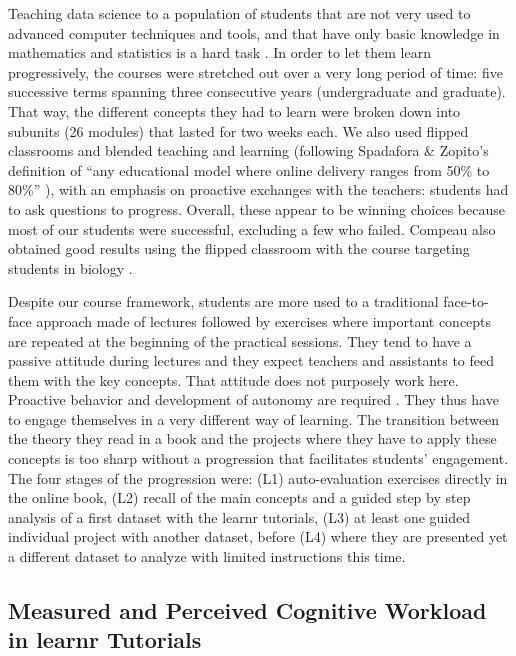 \documentclass{aims}
\theoremstyle{definition}
\begin{document}
Teaching data science to a population of students that are not very used
to advanced computer techniques and tools, and that have only basic
knowledge in mathematics and statistics is a hard task \cite{Sousa2018}.
In order to let them learn progressively, the courses were stretched out
over a very long period of time: five successive terms spanning three
consecutive years (undergraduate and graduate). That way, the different
concepts they had to learn were broken down into subunits (26 modules)
that lasted for two weeks each. We also used flipped classrooms and
blended teaching and learning (following Spadafora \& Zopito's
definition of ``any educational model where online delivery ranges from
50\% to 80\%'' \cite{Spadafora2018}), with an emphasis on proactive
exchanges with the teachers: students had to ask questions to progress.
Overall, these appear to be winning choices because most of our students
were successful, excluding a few who failed. Compeau also obtained good
results using the flipped classroom with the course targeting students
in biology \cite{Compeau2019}.

Despite our course framework, students are more used to a traditional
face-to-face approach made of lectures followed by exercises where
important concepts are repeated at the beginning of the practical
sessions. They tend to have a passive attitude during lectures and they
expect teachers and assistants to feed them with the key concepts. That
attitude does not purposely work here. Proactive behavior and
development of autonomy are required \cite{Freeman2014}. They thus have
to engage themselves in a very different way of learning. The transition
between the theory they read in a book and the projects where they have
to apply these concepts is too sharp without a progression that
facilitates students' engagement. The four stages of the progression
were: (L1) auto-evaluation exercises directly in the online book, (L2)
recall of the main concepts and a guided step by step analysis of a
first dataset with the learnr tutorials, (L3) at least one guided
individual project with another dataset, before (L4) where they are
presented yet a different dataset to analyze with limited instructions
this time.

\hypertarget{measured-and-perceived-cognitive-workload-in-learnr-tutorials-2}{%
\subsection{Measured and Perceived Cognitive Workload in learnr
Tutorials}\label{measured-and-perceived-cognitive-workload-in-learnr-tutorials-2}}
\end{document}

